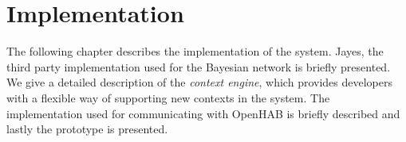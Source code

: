 \chapter{Implementation}
\label{chap:implementation}

The following chapter describes the implementation of the system. Jayes, the third party implementation used for the Bayesian network is briefly presented. We give a detailed description of the \emph{context engine}, which provides developers with a flexible way of supporting new contexts in the system. The implementation used for communicating with OpenHAB is briefly described and lastly the prototype is presented.











